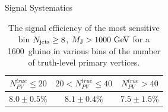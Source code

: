 \begin{section}{Signal Systematics}
\begin{table}[tbp!]
\centering
\begin{tabular}{ |c|c|c| }
\hline
$N_{PV}^{true} \leq 20$ & $20 < N_{PV}^{true} \leq 40$ & $N_{PV}^{true} > 40$ \\ \hline
$8.0 \pm 0.5\%$ & $8.1 \pm 0.4\%$ & $7.5 \pm 1.5\%$ \\ \hline
\end{tabular}
\caption{The signal efficiency of the most sensitive bin $N_{\mathrm{jets}} \geq 8$, $M_{\mathrm{J}} > 1000~\mathrm{Ge\kern -0.1em V}$ for a 1600~\GeV gluino in various bins of the number of truth-level primary vertices.}
\label{tab:sig_pu_dependence}
\end{table}

\end{section}

